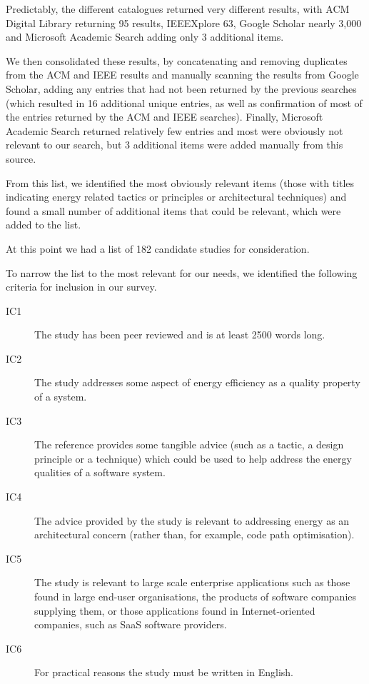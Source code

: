 Predictably, the different catalogues returned very different results, with ACM Digital Library returning 95 results, IEEEXplore 63, Google Scholar nearly 3,000 and Microsoft Academic Search adding only 3 additional items.

We then consolidated these results, by concatenating and removing duplicates from the ACM and IEEE results and manually scanning the results from Google Scholar, adding any entries that had not been returned by the previous searches (which resulted in 16 additional unique entries, as well as confirmation of most of the entries returned by the ACM and IEEE searches).  Finally, Microsoft Academic Search returned relatively few entries and most were obviously not relevant to our search, but 3 additional items were added manually from this source.

From this list, we identified the most obviously relevant items (those with titles indicating energy related tactics or principles or architectural techniques) and found a small number of additional items that could be relevant, which were added to the list.

At this point we had a list of 182 candidate studies for consideration.

To narrow the list to the most relevant for our needs, we identified the following criteria for inclusion in our survey.

\begin{description}
	\item[IC1] The study has been peer reviewed and is at least 2500 words long.
	\item[IC2] The study addresses some aspect of energy efficiency as a quality property of a system.
	\item[IC3] The reference provides some tangible advice (such as a tactic, a design principle or a technique) which could be used to help address the energy qualities of a software system.
	\item[IC4] The advice provided by the study is relevant to addressing energy as an architectural concern (rather than, for example, code path optimisation).
	\item[IC5] The study is relevant to large scale enterprise applications such as those found in large end-user organisations, the products of software companies supplying them, or those applications found in Internet-oriented companies, such as SaaS software providers.
	\item[IC6] For practical reasons the study must be written in English.
\end{description}

